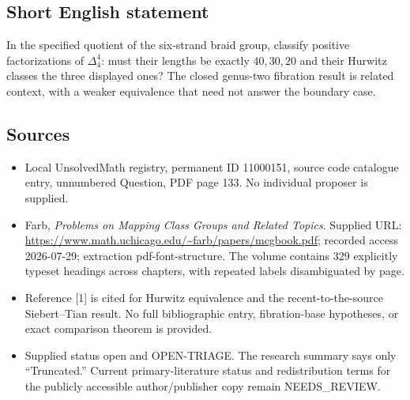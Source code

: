 \documentclass[11pt]{article}
\begin{document}
\subsection{Short English statement}
In the specified quotient of the six-strand braid group, classify positive factorizations of \(\Delta_4^4\): must their lengths be exactly \(40,30,20\) and their Hurwitz classes the three displayed ones? The closed genus-two fibration result is related context, with a weaker equivalence that need not answer the boundary case.
\subsection{Sources}
\begin{itemize}
\item Local UnsolvedMath registry, permanent ID 11000151, source code catalogue entry, unnumbered Question, PDF page 133. No individual proposer is supplied.
\item Farb, \emph{Problems on Mapping Class Groups and Related Topics}. Supplied URL: \url{https://www.math.uchicago.edu/~farb/papers/mcgbook.pdf}; recorded access 2026-07-29; extraction pdf-font-structure. The volume contains 329 explicitly typeset headings across chapters, with repeated labels disambiguated by page.
\item Reference [1] is cited for Hurwitz equivalence and the recent-to-the-source Siebert--Tian result. No full bibliographic entry, fibration-base hypotheses, or exact comparison theorem is provided.
\item Supplied status open and OPEN-TRIAGE. The research summary says only ``Truncated.'' Current primary-literature status and redistribution terms for the publicly accessible author/publisher copy remain NEEDS\_REVIEW.
\end{itemize}
\end{document}
